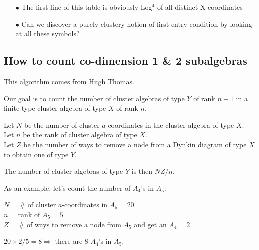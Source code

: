 \documentclass[12pt]{article}
\begin{document}
\begin{center}
\begin{enumerate}
\item[$\bullet$] The first line of this table is obviously Log$^4$ of all distinct X-coordinates 
\item[$\bullet$] Can we discover a purely-clustery notion of first entry condition by looking at all these symbols?
\end{enumerate}

\end{center}

\pagebreak
\subsection*{How to count co-dimension 1 \& 2 subalgebras}

This algorithm comes from Hugh Thomas.

Our goal is to count the number of cluster algebras of type \(Y\) of rank \(n-1\) in a finite type cluster algebra of type \(X\) of rank \(n\).

Let \(N\) be the number of cluster \(a\)-coordinates in the cluster algebra of type \(X\).\\
Let \(n\) be the rank of cluster algebra of type \(X\).\\
Let \(Z\) be the number of ways to remove a node from a Dynkin diagram of type \(X\) to obtain one of type \(Y\).

The number of cluster algebras of type \(Y\) is then \(NZ/n\).

As an example, let's count the number of \(A_4\)'s in \(A_5\):

\(N\) = \# of cluster \(a\)-coordinates in \(A_5 = 20\)\\
\(n\) = rank of \(A_5 = 5\)\\
\(Z\) = \# of ways to remove a node from \(A_5\) and get an \(A_4 = 2\)

\(20\times2/5 = 8 \Rightarrow\) there are 8 \(A_4\)'s in \(A_5\).
\end{document}
